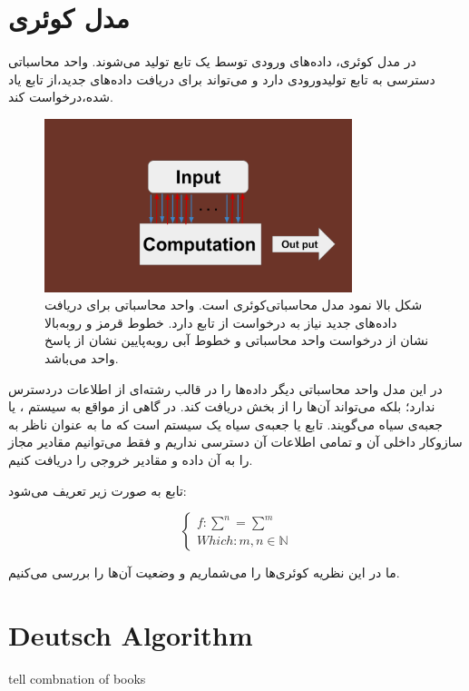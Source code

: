 \documentclass{book}
\begin{document}
\section{مدل کوئری}
در مدل کوئری، داده‌های ورودی توسط یک تابع تولید می‌شوند. واحد محاسباتی دسترسی به تابع تولیدورودی دارد و می‌تواند برای دریافت داده‌های جدید،‌از تابع یاد شده،‌درخواست کند.

\begin{figure}[ht]
	\centering
	\includegraphics[width=0.8\textwidth]{Query computation model.png}
	\caption{شکل بالا نمود مدل محاسباتی‌کوئری است. واحد محاسباتی برای دریافت داده‌های جدید نیاز به درخواست از تابع  دارد. خطوط قرمز و روبه‌بالا نشان از درخواست واحد محاسباتی و خطوط آبی روبه‌پایین نشان از پاسخ واحد می‌باشد.}
\end{figure}


در این مدل واحد محاسباتی دیگر داده‌ها را در قالب رشته‌ای از اطلاعات دردسترس ندارد؛ بلکه می‌تواند آن‌ها را از بخش  دریافت کند. در گاهی از مواقع به سیستم ،‌ یا جعبه‌ی سیاه می‌گویند. تابع  یا جعبه‌ی سیاه یک سیستم است که ما به عنوان ناظر به سازوکار داخلی آن و  تمامی اطلاعات آن دسترسی نداریم و فقط می‌توانیم مقادیر مجاز را به آن داده و مقادیر خروجی را دریافت کنیم. 

تابع  به صورت زیر تعریف می‌شود:
\begin{center}
$$
\left\{
\begin{array}{ll}
f : \sum^n = \sum^m\\
Which : m, n \in \mathbb{N}
\end{array}
\right.
$$
\end{center}

ما در این نظریه کوئری‌ها را می‌شماریم و وضعیت آن‌‌ها را بررسی می‌کنیم.

\section{Deutsch Algorithm}
tell combnation of books
\end{document}
